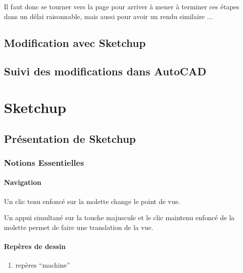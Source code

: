 \documentclass[a4paper,12pt,french]{sphinxmanual}
\begin{document}
Il faut donc se tourner vers la page {\hyperref[acad/config_acad:config\string-acad]{}} pour arriver à mener à terminer ces étapes dans un délai raisonnable, mais aussi pour avoir un rendu similaire ...


\section{Modification avec Sketchup}
\label{init_su+acad/su2:modification-avec-sketchup}\label{init_su+acad/su2::doc}

\section{Suivi des modifications dans AutoCAD}
\label{init_su+acad/acad2::doc}\label{init_su+acad/acad2:suivi-des-modifications-dans-autocad}

\chapter{Sketchup}
\label{su/index:sketchup}\label{su/index::doc}\label{su/index:index-su}

\section{Présentation de Sketchup}
\label{su/intro-su:presentation-de-sketchup}\label{su/intro-su::doc}

\subsection{Notions Essentielles}
\label{su/intro-su:notions-essentielles}\label{su/intro-su:notions-essentielles-su}

\subsubsection{Navigation}
\label{su/intro-su:navigation}
Un clic tenu enfoncé sur la molette change le point de vue.

Un appui simultané sur la touche majuscule et le clic maintenu enfoncé de la molette permet de faire une translation de la vue.


\subsubsection{Repères de dessin}
\label{su/intro-su:reperes-de-dessin}\begin{enumerate}
\item {} 
repères ``machine''

\end{enumerate}
\end{document}
